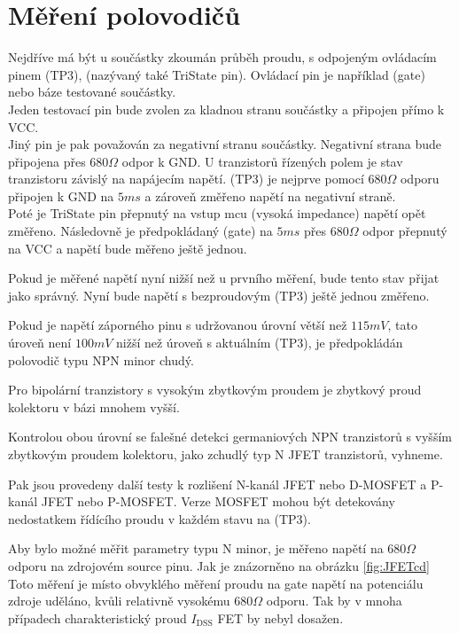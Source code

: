 \section{Měření polovodičů}
Nejdříve má být u součástky zkoumán průběh proudu, s odpojeným ovládacím pinem (TP3), (nazývaný také TriState pin). Ovládací pin je například (gate) nebo báze testované součástky.\\
Jeden testovací pin bude zvolen za kladnou stranu součástky a připojen přímo k VCC.\\
Jiný pin je pak považován za negativní stranu součástky.
Negativní strana bude připojena přes \(680\Omega\) odpor k GND.
U tranzistorů řízených polem je stav tranzistoru závislý na napájecím napětí.
(TP3) je nejprve pomocí \(680\Omega\) odporu připojen  k GND na \(5ms\) a zároveň změřeno napětí na negativní straně.\\Poté je TriState pin  přepnutý na vstup mcu (vysoká impedance) napětí opět změřeno.
Následovně je předpokládaný (gate) na \(5ms\) přes \(680\Omega\) odpor  přepnutý na VCC a napětí bude měřeno ještě jednou.

Pokud je měřené napětí nyní nižší než u prvního měření, bude tento stav přijat jako správný.
Nyní bude napětí s bezproudovým (TP3) ještě jednou změřeno.

Pokud je napětí záporného pinu s udržovanou úrovní větší než \(115mV\), tato úroveň není \(100mV\) nižší než úroveň s aktuálním (TP3), je předpokládán polovodič typu NPN minor chudý.

Pro bipolární tranzistory s vysokým zbytkovým proudem je zbytkový proud kolektoru 
v bázi mnohem vyšší.

Kontrolou obou úrovní se falešné detekci germaniových NPN tranzistorů s vyšším zbytkovým proudem kolektoru,
jako zchudlý typ N JFET tranzistorů, vyhneme.

Pak jsou provedeny další testy k rozlišení N-kanál JFET nebo D-MOSFET a P-kanál JFET nebo P-MOSFET.
Verze MOSFET mohou být detekovány nedostatkem řídícího proudu v každém stavu na (TP3).

Aby bylo možné měřit parametry typu N minor, je měřeno napětí na \(680\Omega\) odporu na zdrojovém source pinu. Jak je znázorněno na obrázku \ref{fig:JFETcd} Toto měření je místo obvyklého měření proudu na gate napětí na potenciálu zdroje uděláno, kvůli relativně vysokému \(680\Omega\) odporu. Tak by v mnoha případech charakteristický proud \(I_\mathrm{DSS}\) FET by nebyl dosažen.

